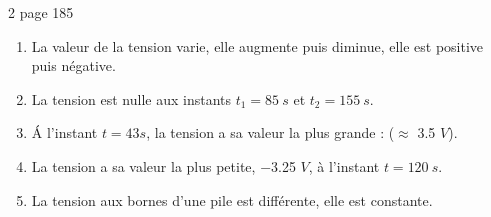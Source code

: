 \begin{myact}{2 page 185}
	\begin{enumerate}
		\item La valeur de la tension varie, elle augmente puis diminue, elle est positive puis négative.\pause
		\item La tension est nulle aux instants $t_1  =  85 \ s$ et $t_2  =  155 \ s$.\pause
		\item \'A l'instant $t  =  43  s$, la tension a sa valeur la plus grande : ($ \approx $ \num{3.5} $ V $).\pause
		\item La tension a sa valeur la plus petite, \num{-3.25} $V$, à l'instant $t  =  120 \ s$.\pause
		\item La tension aux bornes d'une pile est différente, elle est constante.
	\end{enumerate}
\end{myact}